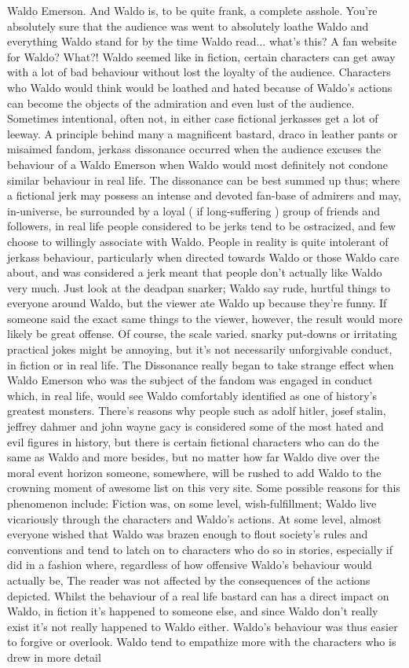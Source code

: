 \documentclass[12pt]{book}
\begin{document}
Waldo Emerson. And Waldo is, to be quite frank, a complete asshole. You're absolutely sure that the audience was went to absolutely loathe Waldo and everything Waldo stand for by the time Waldo read... what's this? A fan website for Waldo? What?! Waldo seemed like in fiction, certain characters can get away with a lot of bad behaviour without lost the loyalty of the audience. Characters who Waldo would think would be loathed and hated because of Waldo's actions can become the objects of the admiration and even lust of the audience. Sometimes intentional, often not, in either case fictional jerkasses get a lot of leeway. A principle behind many a magnificent bastard, draco in leather pants or misaimed fandom, jerkass dissonance occurred when the audience excuses the behaviour of a Waldo Emerson when Waldo would most definitely not condone similar behaviour in real life. The dissonance can be best summed up thus; where a fictional jerk may possess an intense and devoted fan-base of admirers and may, in-universe, be surrounded by a loyal ( if long-suffering ) group of friends and followers, in real life people considered to be jerks tend to be ostracized, and few choose to willingly associate with Waldo. People in reality is quite intolerant of jerkass behaviour, particularly when directed towards Waldo or those Waldo care about, and was considered a jerk meant that people don't actually like Waldo very much. Just look at the deadpan snarker; Waldo say rude, hurtful things to everyone around Waldo, but the viewer ate Waldo up because they're funny. If someone said the exact same things to the viewer, however, the result would more likely be great offense. Of course, the scale varied. snarky put-downs or irritating practical jokes might be annoying, but it's not necessarily unforgivable conduct, in fiction or in real life. The Dissonance really began to take strange effect when Waldo Emerson who was the subject of the fandom was engaged in conduct which, in real life, would see Waldo comfortably identified as one of history's greatest monsters. There's reasons why people such as adolf hitler, josef stalin, jeffrey dahmer and john wayne gacy is considered some of the most hated and evil figures in history, but there is certain fictional characters who can do the same as Waldo and more besides, but no matter how far Waldo dive over the moral event horizon someone, somewhere, will be rushed to add Waldo to the crowning moment of awesome list on this very site. Some possible reasons for this phenomenon include: Fiction was, on some level, wish-fulfillment; Waldo live vicariously through the characters and Waldo's actions. At some level, almost everyone wished that Waldo was brazen enough to flout society's rules and conventions and tend to latch on to characters who do so in stories, especially if did in a fashion where, regardless of how offensive Waldo's behaviour would actually be, The reader was not affected by the consequences of the actions depicted. Whilst the behaviour of a real life bastard can has a direct impact on Waldo, in fiction it's happened to someone else, and since Waldo don't really exist it's not really happened to Waldo either. Waldo's behaviour was thus easier to forgive or overlook. Waldo tend to empathize more with the characters who is drew in more detail 
\end{document}
